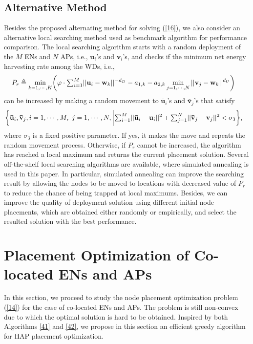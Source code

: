 \documentclass[journal, draftcls, one column, 12pt]{IEEEtran}
\begin{document}
\subsection{Alternative Method}
Besides the proposed alternating method for solving (\ref{16}), we also consider an alternative local searching method used as benchmark algorithm for performance comparison. The local searching algorithm starts with a random deployment of the $M$ ENs and $N$ APs, i.e., $\mathbf{u}_i$'s and $\mathbf{v}_i$'s, and checks if the minimum net energy harvesting rate among the WDs, i.e.,
\begin{equation}
\begin{aligned}
P_r \triangleq \min_{k = 1,\cdots,K} &\biggl(\varphi \cdot \mathsmaller\sum_{i=1}^M ||\mathbf{u}_i -\mathbf{w}_k||^{-d_D}  - a_{1,k}- a_{2,k} \min_{j=1,\cdots,N} ||\mathbf{v}_{j} - \mathbf{w}_k||^{d_U}\biggr)
\end{aligned}
\end{equation}
can be increased by making a random movement to $\mathbf{\bar{u}}_i$'s and $\mathbf{\bar{v}}_j$'s that satisfy
\begin{equation}
\begin{aligned}
&\biggl\{\mathbf{\bar{u}}_i,\mathbf{\bar{v}}_j, i=1,\cdots,M,\ j=1,\cdots,N, \bigg| \mathsmaller\sum_{i=1}^M ||\mathbf{\bar{u}}_i-\mathbf{u}_i||^2 + \mathsmaller\sum_{j=1}^N ||\mathbf{\bar{v}}_j-\mathbf{v}_j||^2< \sigma_3\biggr\},
\end{aligned}
\end{equation}
where $\sigma_3$ is a fixed positive parameter. If yes, it makes the move and repeats the random movement process. Otherwise, if $P_r$ cannot be increased, the algorithm has reached a local maximum and returns the current placement solution. Several off-the-shelf local searching algorithms are available, where simulated annealing \cite{2010:Hromkovic} is used in this paper. In particular, simulated annealing can improve the searching result by allowing the nodes to be moved to locations with decreased value of $P_r$ to reduce the chance of being trapped at local maximums. Besides, we can improve the quality of deployment solution using different initial node placements, which are obtained either randomly or empirically, and select the resulted solution with the best performance.

\section{Placement Optimization of Co-located ENs and APs}
In this section, we proceed to study the node placement optimization problem (\ref{14}) for the case of co-located ENs and APs. The problem is still non-convex due to which the optimal solution is hard to be obtained. Inspired by both Algorithms \ref{41} and \ref{42}, we propose in this section an efficient greedy algorithm for HAP placement optimization.
\end{document}
